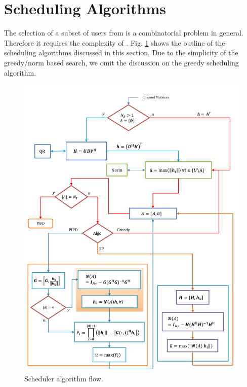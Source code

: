 \documentclass[conference,letterpaper,10pt]{./../../IEEE/IEEEtran}
\begin{document}
\section{Scheduling Algorithms}
\label{sec:sched_discussions}
The selection of a subset of users  from  is a combinatorial problem in general. Therefore it requires the complexity of . Fig. \ref{kuva:scheduler_block_diag} shows the outline of the scheduling algorithms discussed in this section. Due to the simplicity of the greedy/norm based search, we omit the discussion on the greedy scheduling algorithm.
\begin{figure}
	\centering
	\includegraphics[trim=0in 0.25in 0in 0.5in,width=\columnwidth, angle=0]{system_model}
	\caption{Scheduler algorithm flow.}
	\label{kuva:scheduler_block_diag}
	 \vspace{-0.1in}
\end{figure}
\end{document}
